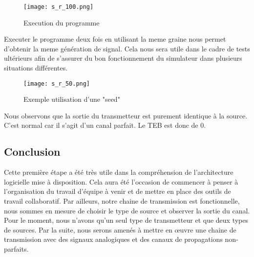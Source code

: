 \begin{figure}[H]
    \centering
    \texttt{[image: s\_r\_100.png]}
    \caption{Execution du programme}
\end{figure}

\pagebreak

Executer le programme deux fois en utilisant la meme graine nous permet d'obtenir la meme génération de signal.
Cela nous sera utile dans le cadre de tests ultérieurs afin de s'assurer du bon fonctionnement du simulateur dans plusieurs situations différentes.

\begin{figure}[H]
    \centering
    \texttt{[image: s\_r\_50.png]}
    \caption{Exemple utilisation d'une "seed"}
\end{figure}

Nous observons que la sortie du transmetteur est purement identique à la source. C'est normal car il s'agit d'un canal parfait. Le TEB est donc de 0.

\subsection{Conclusion}

Cette première étape a été très utile dans la compréhension de l'architecture logicielle mise à disposition.
Cela aura été l'occasion de commencer à penser à l'organisation du travail d'équipe à venir et de mettre en place des outils de travail collaboratif.
Par ailleurs, notre chaine de transmission est fonctionnelle, nous sommes en mesure de choisir le type de source et observer la sortie du canal.
Pour le moment, nous n'avons qu'un seul type de transmetteur et que deux types de sources. Par la suite, nous serons amenés à mettre en œuvre une chaine de transmission avec des signaux analogiques et des canaux de propagations non-parfaits.